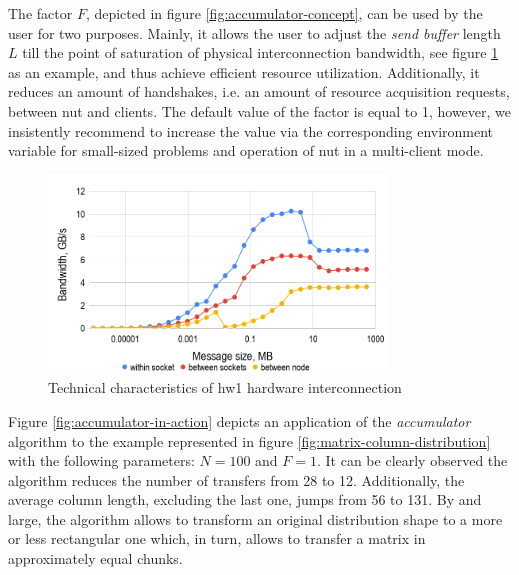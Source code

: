 The factor $F$, depicted in figure \ref{fig:accumulator-concept}, can be used by the user for two purposes. Mainly, it allows the user to adjust the \textit{send buffer} length $L$ till the point of saturation of physical interconnection bandwidth, see figure \ref{fig:hw1-bandwidth} as an example, and thus achieve efficient resource utilization. Additionally, it reduces an amount of handshakes, i.e. an amount of resource acquisition requests, between \acrshort{nut} and clients. The default value of the factor is equal to 1, however, we insistently recommend to increase the value via the corresponding environment variable for small-sized problems and operation of \acrshort{nut} in a multi-client mode.\\


\begin{figure}[htpb]
  \centering
  \includegraphics[width=0.8\textwidth]{figures/chapter-3/hw1-bandwidth.png}
  \caption{Technical characteristics of  \gls{hw1} hardware interconnection} \label{fig:hw1-bandwidth}
\end{figure}



Figure \ref{fig:accumulator-in-action} depicts an application of the \textit{accumulator} algorithm to the example represented in figure \ref{fig:matrix-column-distribution} with the following parameters: $N = 100$ and $F = 1$. It can be clearly observed the algorithm reduces the number of transfers from 28 to 12. Additionally, the average column length, excluding the last one, jumps from 56 to 131. By and large, the algorithm allows to transform an original distribution shape to a more or less rectangular one which, in turn, allows to transfer a matrix in approximately equal chunks.\\



